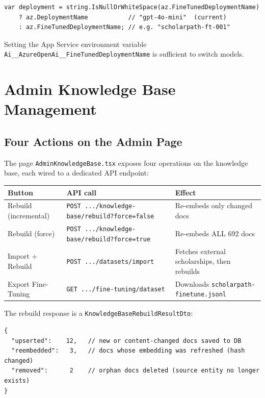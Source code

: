 \documentclass[11pt,a4paper]{article}
\begin{document}
\begin{lstlisting}[language={[Sharp]C},caption={Automatic fine-tuned model selection}]
var deployment = string.IsNullOrWhiteSpace(az.FineTunedDeploymentName)
    ? az.DeploymentName           // "gpt-4o-mini"  (current)
    : az.FineTunedDeploymentName; // e.g. "scholarpath-ft-001"
\end{lstlisting}

Setting the App Service environment variable
\texttt{Ai\_\_AzureOpenAi\_\_FineTunedDeploymentName} is sufficient to switch models.

\section{Admin Knowledge Base Management}

\subsection{Four Actions on the Admin Page}

The page \texttt{AdminKnowledgeBase.tsx} exposes four operations on the knowledge base,
each wired to a dedicated API endpoint:

\begin{center}
\begin{tabular}{p{3.0cm}p{5.8cm}p{4.4cm}}
\toprule
\textbf{Button} & \textbf{API call} & \textbf{Effect}\\
\midrule
Rebuild (incremental) &
  \texttt{POST .../knowledge-base/rebuild?force=false} &
  Re-embeds only changed docs\\
Rebuild (force) &
  \texttt{POST .../knowledge-base/rebuild?force=true} &
  Re-embeds ALL 692 docs\\
Import + Rebuild &
  \texttt{POST .../datasets/import} &
  Fetches external scholarships, then rebuilds\\
Export Fine-Tuning &
  \texttt{GET .../fine-tuning/dataset} &
  Downloads \texttt{scholarpath-finetune.jsonl}\\
\bottomrule
\end{tabular}
\end{center}

The rebuild response is a \texttt{KnowledgeBaseRebuildResultDto}:

\begin{lstlisting}[language={},caption={Admin UI receives this on every rebuild}]
{
  "upserted":    12,   // new or content-changed docs saved to DB
  "reembedded":   3,   // docs whose embedding was refreshed (hash changed)
  "removed":      2    // orphan docs deleted (source entity no longer exists)
}
\end{lstlisting}
\end{document}
